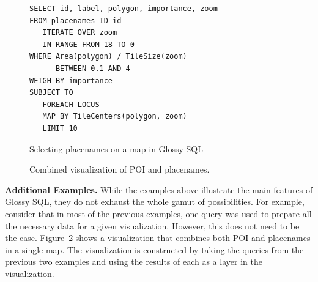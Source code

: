 \documentclass[11pt, oneside]{report}
\newcommand{\minisec}[1]{\noindent\textbf{#1.}}
\begin{document}
{%
\begin{figure}[!t]
\begin{center}
\begin{lstlisting}
SELECT id, label, polygon, importance, zoom
FROM placenames ID id
   ITERATE OVER zoom 
   IN RANGE FROM 18 TO 0
WHERE Area(polygon) / TileSize(zoom) 
      BETWEEN 0.1 AND 4
WEIGH BY importance
SUBJECT TO
   FOREACH LOCUS
   MAP BY TileCenters(polygon, zoom)
   LIMIT 10
\end{lstlisting}
\vspace*{-2ex}
\caption{Selecting placenames on a map in Glossy SQL}
\label{fig:glossy:sql:placenames}
\end{center}
\vspace*{-4ex}
\end{figure}

\begin{figure}[t]
\centering
{}
\vspace{-1ex}
\caption{Combined visualization of POI and placenames.} 
\label{fig:tourism:viz}
\vspace{-2ex}
\end{figure}

\minisec{Additional Examples}
While the examples above illustrate the main features of Glossy SQL, they do not exhaust the whole gamut of possibilities. For example, consider that in most of the previous examples, one query was used to prepare all the necessary data for a given visualization. However, this does not need to be the case. Figure~\ref{fig:tourism:viz} shows a visualization that combines both POI and placenames in a single map. The visualization is constructed by taking the queries from the previous two examples and using the results of each as a layer in the visualization. 

}
\end{document}
